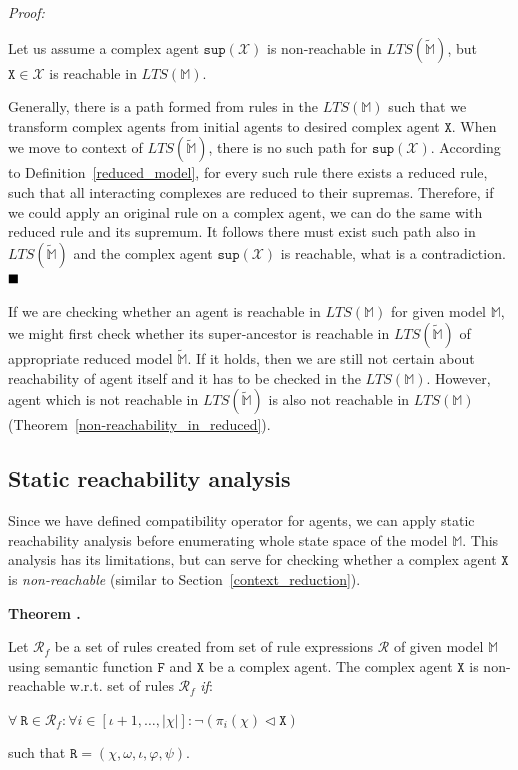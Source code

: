 \documentclass[12pt, twoside]{fithesis2} %
\newcounter{counter}[section]
\renewcommand{\thecounter}{\thesection.\arabic{counter}}
\newenvironment{proof}{\noindent\emph{Proof:~ }\nopagebreak \begin{itshape}}{\end{itshape}\bigskip}
\newenvironment{theorem}{\bigskip\refstepcounter{counter}\noindent\textbf{Theorem \thecounter }\nopagebreak \begin{itshape}}{\end{itshape}\medskip}
\newcommand*{\QEDA}{\hfill\ensuremath{\blacksquare}}%
\begin{document}
\begin{proof}
Let us assume a complex agent $\mathtt{sup}(\mathscr{X})$ is non-reachable in $LTS(\widetilde{\mathds{M}})$, but $\mathtt{X} \in \mathscr{X}$ is reachable in $LTS(\mathds{M})$.

Generally, there is a path formed from rules in the $LTS(\mathds{M})$ such that we transform complex agents from initial agents to desired complex agent $\mathtt{X}$. When we move to context of $LTS(\widetilde{\mathds{M}})$, there is no such path for $\mathtt{sup}(\mathscr{X})$. According to Definition~\ref{reduced_model}, for every such rule there exists a reduced rule, such that all interacting complexes are reduced to their supremas. Therefore, if we could apply an original rule on a complex agent, we can do the same with reduced rule and its supremum. It follows there must exist such path also in $LTS(\widetilde{\mathds{M}})$ and the complex agent $\mathtt{sup}(\mathscr{X})$ is reachable, what is a contradiction. $\QEDA$
\end{proof}

If we are checking whether an agent is reachable in $LTS(\mathds{M})$ for given model $\mathds{M}$, we might first check whether its super-ancestor is reachable in $LTS(\widetilde{\mathds{M}})$ of appropriate reduced model $\widetilde{\mathds{M}}$. If it holds, then we are still not certain about reachability of agent itself and it has to be checked in the $LTS(\mathds{M})$. However, agent which is not reachable in $LTS(\widetilde{\mathds{M}})$ is also not reachable in $LTS(\mathds{M})$ (Theorem~\ref{non-reachability_in_reduced}).

\subsection{Static reachability analysis}
\label{static_reachability_analysis}

Since we have defined compatibility operator for agents, we can apply static reachability analysis before enumerating whole state space of the model $\mathds{M}$. This analysis has its limitations, but can serve for checking whether a complex agent $\mathtt{X}$ is \emph{non-reachable} (similar to Section~\ref{context_reduction}).

\begin{theorem}
\label{static_reach}
Let $\mathcal{R}_f$ be a set of rules created from set of rule expressions $\mathcal{R}$ of given model $\mathds{M}$ using semantic function $\mathtt{F}$ and $\mathtt{X}$ be a complex agent. The complex agent $\mathtt{X}$ is non-reachable w.r.t. set of rules $\mathcal{R}_f$ \emph{if}:

\begin{center}
$\forall~ \mathtt{R} \in \mathcal{R}_f: \forall i \in [\iota+1, \ldots, |\chi|] : \neg ( \pi_i(\chi) \lhd \mathtt{X})$
\end{center}

\noindent such that $\mathtt{R} = (\chi, \omega, \iota, \varphi, \psi)$.
\end{theorem}
\end{document}
